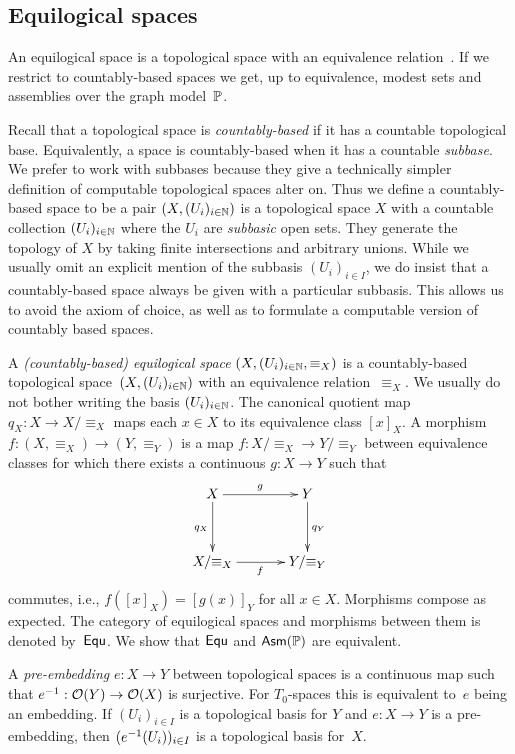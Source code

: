 \subsection{Equilogical spaces}
\label{sec:equilogical-spaces}


An equilogical space is a topological space with an
equivalence relation~\cite{BauerA:equs}. If we restrict to
countably-based spaces we get, up to equivalence, modest sets and
assemblies over the graph model~$\mathbb{P}$.

Recall that a topological space is \emph{countably-based} if it has a
countable topological base. Equivalently, a space is countably-based
when it has a countable \emph{subbase}. We prefer to work with
subbases because they give a technically simpler definition of
computable topological spaces alter on. Thus we define a
countably-based space to be a pair $(X, (U_i)_{i \in \mathbb{N}})$ is a
topological space $X$ with a countable collection $(U_i)_{i \in \mathbb{N}}$
where the $U_i$ are \emph{subbasic} open sets. They generate the
topology of $X$ by taking finite intersections and arbitrary unions.
While we usually omit an explicit mention of the subbasis $(U_i)_{i
  \in I}$, we do insist that a countably-based space always be given
with a particular subbasis. This allows us to avoid the axiom of
choice, as well as to formulate a computable version of countably
based spaces.

A \emph{(countably-based) equilogical space} $(X, (U_i)_{i \in \mathbb{N}},
{\equiv_X})$ is a countably-based topological space~$(X, (U_i)_{i \in
  \mathbb{N}})$ with an equivalence relation~$\equiv_X$. We usually do not
bother writing the basis $(U_i)_{i \in \mathbb{N}}$. The canonical quotient
map $q_X : X \to X/{\equiv_X}$ maps each $x \in X$ to its equivalence
class $[x]_X$. A morphism $f : (X,{\equiv_X}) \to (Y,{\equiv_Y})$ is a
map $f : X/{\equiv_X} \to Y/{\equiv_Y}$ between equivalence classes
for which there exists a continuous $g : X \to Y$ such that
%
\begin{equation*}
  \xymatrix@+1em{
    {X} \ar[d]_{q_X} \ar[r]^g
    &
    {Y} \ar[d]^{q_Y}
    \\
    {X/{\equiv_X}}
    \ar[r]_f
    &
    {Y/{\equiv_Y}}
  }
\end{equation*}
%
commutes, i.e., $f([x]_X) = [g(x)]_Y$ for all $x \in X$. Morphisms
compose as expected. The category of equilogical spaces and morphisms
between them is denoted by~$\mathsf{Equ}$. We show that $\mathsf{Equ}$ and
$\mathsf{Asm}(\mathbb{P})$ are equivalent.

A \emph{pre-embedding} $e : X \to Y$ between topological spaces is a
continuous map such that ${e}^{-1} : \mathcal{O}(Y) \to \mathcal{O}(X)$ is
surjective. For $T_0$-spaces this is equivalent to~$e$ being an
embedding. If $(U_i)_{i \in I}$ is a topological basis for $Y$ and $e
: X \to Y$ is a pre-embedding, then $({e}^{-1}(U_i))_{i \in I}$ is a
topological basis for~$X$.

